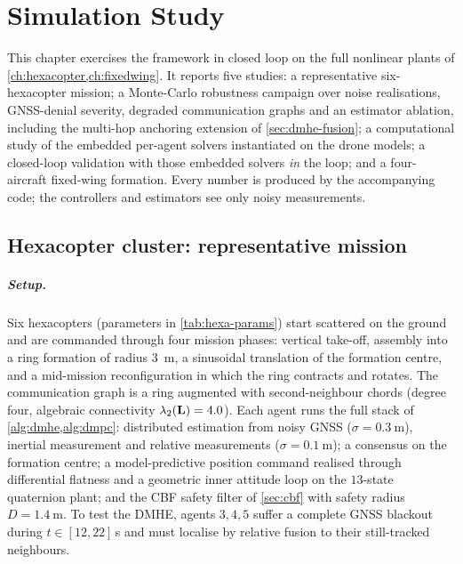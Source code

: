 \chapter{Simulation Study}
\label{ch:simulation}

This chapter exercises the framework in closed loop on the full nonlinear plants
of \cref{ch:hexacopter,ch:fixedwing}. It reports five studies: a representative
six-hexacopter mission; a Monte-Carlo robustness campaign over noise
realisations, GNSS-denial severity, degraded communication graphs and an
estimator ablation, including the multi-hop anchoring extension of
\cref{sec:dmhe-fusion}; a computational study of the embedded per-agent solvers
instantiated on the drone models; a closed-loop validation with those embedded
solvers \emph{in} the loop; and a four-aircraft fixed-wing formation.
Every number is produced by the accompanying code; the controllers and
estimators see only noisy measurements.

\section{Hexacopter cluster: representative mission}
\label{sec:sim-hexa}

\paragraph{Setup.} Six hexacopters (parameters in \cref{tab:hexa-params}) start
scattered on the ground and are commanded through four mission phases: vertical
take-off, assembly into a ring formation of radius \SI{3}{\meter}, a sinusoidal
translation of the formation centre, and a mid-mission reconfiguration in which
the ring contracts and rotates. The communication graph is a ring augmented with
second-neighbour chords (degree four, algebraic connectivity
$\lambda_2(\mathbf{L})=4.0$). Each agent runs the full stack of
\cref{alg:dmhe,alg:dmpc}: distributed estimation from noisy GNSS
($\sigma=\SI{0.3}{\meter}$), inertial measurement and relative measurements
($\sigma=\SI{0.1}{\meter}$); a consensus on the formation centre; a
model-predictive position command realised through differential flatness and a
geometric inner attitude loop on the $13$-state quaternion plant; and the CBF
safety filter of \cref{sec:cbf} with safety radius $D=\SI{1.4}{\meter}$. To test
the DMHE, agents $3,4,5$ suffer a complete GNSS blackout during $t\in[12,22]\,$s
and must localise by relative fusion to their still-tracked neighbours.


